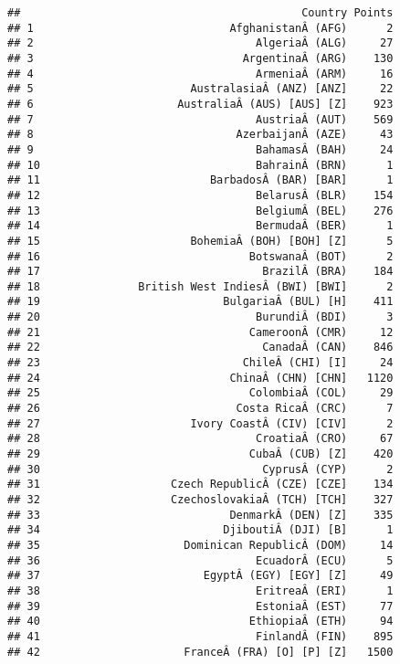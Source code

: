 \documentclass[
]{article}
\begin{document}
\begin{verbatim}
##                                           Country Points
## 1                              AfghanistanÂ (AFG)      2
## 2                                  AlgeriaÂ (ALG)     27
## 3                                ArgentinaÂ (ARG)    130
## 4                                  ArmeniaÂ (ARM)     16
## 5                        AustralasiaÂ (ANZ) [ANZ]     22
## 6                      AustraliaÂ (AUS) [AUS] [Z]    923
## 7                                  AustriaÂ (AUT)    569
## 8                               AzerbaijanÂ (AZE)     43
## 9                                  BahamasÂ (BAH)     24
## 10                                 BahrainÂ (BRN)      1
## 11                          BarbadosÂ (BAR) [BAR]      1
## 12                                 BelarusÂ (BLR)    154
## 13                                 BelgiumÂ (BEL)    276
## 14                                 BermudaÂ (BER)      1
## 15                       BohemiaÂ (BOH) [BOH] [Z]      5
## 16                                BotswanaÂ (BOT)      2
## 17                                  BrazilÂ (BRA)    184
## 18               British West IndiesÂ (BWI) [BWI]      2
## 19                            BulgariaÂ (BUL) [H]    411
## 20                                 BurundiÂ (BDI)      3
## 21                                CameroonÂ (CMR)     12
## 22                                  CanadaÂ (CAN)    846
## 23                               ChileÂ (CHI) [I]     24
## 24                             ChinaÂ (CHN) [CHN]   1120
## 25                                ColombiaÂ (COL)     29
## 26                              Costa RicaÂ (CRC)      7
## 27                       Ivory CoastÂ (CIV) [CIV]      2
## 28                                 CroatiaÂ (CRO)     67
## 29                                CubaÂ (CUB) [Z]    420
## 30                                  CyprusÂ (CYP)      2
## 31                    Czech RepublicÂ (CZE) [CZE]    134
## 32                    CzechoslovakiaÂ (TCH) [TCH]    327
## 33                             DenmarkÂ (DEN) [Z]    335
## 34                            DjiboutiÂ (DJI) [B]      1
## 35                      Dominican RepublicÂ (DOM)     14
## 36                                 EcuadorÂ (ECU)      5
## 37                         EgyptÂ (EGY) [EGY] [Z]     49
## 38                                 EritreaÂ (ERI)      1
## 39                                 EstoniaÂ (EST)     77
## 40                                EthiopiaÂ (ETH)     94
## 41                                 FinlandÂ (FIN)    895
## 42                      FranceÂ (FRA) [O] [P] [Z]   1500

\end{verbatim}
\end{document}
